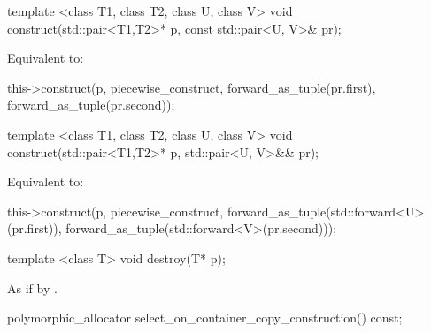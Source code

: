 %
%
\begin{itemdecl}
template <class T1, class T2, class U, class V>
  void construct(std::pair<T1,T2>* p, const std::pair<U, V>& pr);
\end{itemdecl}

\begin{itemdescr}
\pnum
\effects
Equivalent to:
\begin{codeblock}
this->construct(p, piecewise_construct,
                forward_as_tuple(pr.first),
                forward_as_tuple(pr.second));
\end{codeblock}
\end{itemdescr}

%
%
\begin{itemdecl}
template <class T1, class T2, class U, class V>
  void construct(std::pair<T1,T2>* p, std::pair<U, V>&& pr);
\end{itemdecl}

\begin{itemdescr}
\pnum
\effects
Equivalent to:
\begin{codeblock}
this->construct(p, piecewise_construct,
                forward_as_tuple(std::forward<U>(pr.first)),
                forward_as_tuple(std::forward<V>(pr.second)));
\end{codeblock}
\end{itemdescr}

%
%
\begin{itemdecl}
template <class T>
  void destroy(T* p);
\end{itemdecl}

\begin{itemdescr}
\pnum
\effects
As if by .
\end{itemdescr}

%
%
\begin{itemdecl}
polymorphic_allocator select_on_container_copy_construction() const;
\end{itemdecl}

